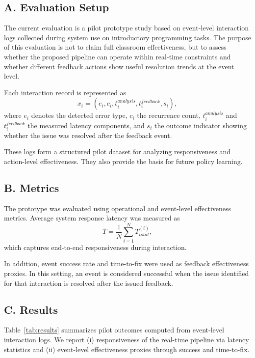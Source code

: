 \documentclass[conference]{IEEEtran}
\begin{document}
\subsection*{A. Evaluation Setup}

The current evaluation is a pilot prototype study based on event-level interaction logs collected during system use on introductory programming tasks. The purpose of this evaluation is not to claim full classroom effectiveness, but to assess whether the proposed pipeline can operate within real-time constraints and whether different feedback actions show useful resolution trends at the event level.

Each interaction record is represented as
\[
x_i = (e_i, c_i, t^{analysis}_i, t^{feedback}_i, s_i),
\]
where $e_i$ denotes the detected error type, $c_i$ the recurrence count, $t^{analysis}_i$ and $t^{feedback}_i$ the measured latency components, and $s_i$ the outcome indicator showing whether the issue was resolved after the feedback event.

These logs form a structured pilot dataset for analyzing responsiveness and action-level effectiveness. They also provide the basis for future policy learning.

\subsection*{B. Metrics}

The prototype was evaluated using operational and event-level effectiveness metrics. Average system response latency was measured as
\[
\bar{T} = \frac{1}{N} \sum_{i=1}^{N} T_{total}^{(i)},
\]
which captures end-to-end responsiveness during interaction.

In addition, event success rate and time-to-fix were used as feedback effectiveness proxies. In this setting, an event is considered successful when the issue identified for that interaction is resolved after the issued feedback.

\subsection*{C. Results}

Table~\ref{tab:results} summarizes pilot outcomes computed from event-level interaction logs. We report (i) responsiveness of the real-time pipeline via latency statistics and (ii) event-level effectiveness proxies through success and time-to-fix.
\end{document}
